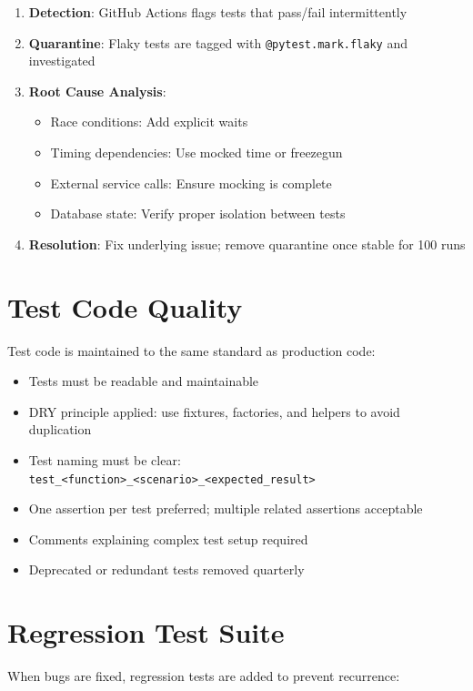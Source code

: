 \documentclass{report}
\begin{document}
\begin{enumerate}
  \item \textbf{Detection}: GitHub Actions flags tests that pass/fail intermittently
  \item \textbf{Quarantine}: Flaky tests are tagged with \texttt{@pytest.mark.flaky} and investigated
  \item \textbf{Root Cause Analysis}:
  \begin{itemize}
    \item Race conditions: Add explicit waits
    \item Timing dependencies: Use mocked time or freezegun
    \item External service calls: Ensure mocking is complete
    \item Database state: Verify proper isolation between tests
  \end{itemize}
  \item \textbf{Resolution}: Fix underlying issue; remove quarantine once stable for 100 runs
\end{enumerate}

\section{Test Code Quality}

Test code is maintained to the same standard as production code:

\begin{itemize}
  \item Tests must be readable and maintainable
  \item DRY principle applied: use fixtures, factories, and helpers to avoid duplication
  \item Test naming must be clear: \texttt{test\_<function>\_<scenario>\_<expected\_result>}
  \item One assertion per test preferred; multiple related assertions acceptable
  \item Comments explaining complex test setup required
  \item Deprecated or redundant tests removed quarterly
\end{itemize}

\section{Regression Test Suite}

When bugs are fixed, regression tests are added to prevent recurrence:
\end{document}
